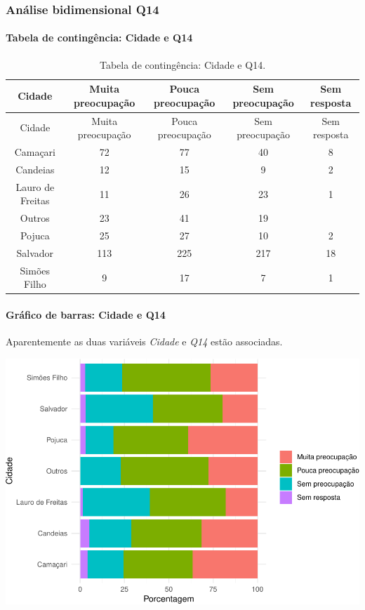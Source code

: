 \documentclass[]{article}
\let\oldparagraph\paragraph
\renewcommand{\paragraph}[1]{\oldparagraph{#1}\mbox{}}
\begin{document}
\cleardoublepage

\hypertarget{anuxe1lise-bidimensional-q14}{%
\subsubsection{Análise bidimensional Q14}\label{anuxe1lise-bidimensional-q14}}

\hypertarget{tabela-de-continguxeancia-cidade-e-q14}{%
\paragraph{Tabela de contingência: Cidade e Q14}\label{tabela-de-continguxeancia-cidade-e-q14}}

\begin{longtable}[]{@{}ccccc@{}}
\caption{\label{tab:unnamed-chunk-60}Tabela de contingência: Cidade e Q14.}\tabularnewline
\toprule
Cidade & Muita preocupação & Pouca preocupação & Sem preocupação & Sem resposta\tabularnewline
\midrule
\endfirsthead
\toprule
Cidade & Muita preocupação & Pouca preocupação & Sem preocupação & Sem resposta\tabularnewline
\midrule
\endhead
Camaçari & 72 & 77 & 40 & 8\tabularnewline
Candeias & 12 & 15 & 9 & 2\tabularnewline
Lauro de Freitas & 11 & 26 & 23 & 1\tabularnewline
Outros & 23 & 41 & 19 &\tabularnewline
Pojuca & 25 & 27 & 10 & 2\tabularnewline
Salvador & 113 & 225 & 217 & 18\tabularnewline
Simões Filho & 9 & 17 & 7 & 1\tabularnewline
\bottomrule
\end{longtable}

\hypertarget{gruxe1fico-de-barras-cidade-e-q14}{%
\paragraph{Gráfico de barras: Cidade e Q14}\label{gruxe1fico-de-barras-cidade-e-q14}}

Aparentemente as duas variáveis \emph{Cidade} e \emph{Q14} estão associadas.

\begin{center}\includegraphics[width=0.75\linewidth]{relatorio_files/figure-latex/unnamed-chunk-61-1} \end{center}
\end{document}
